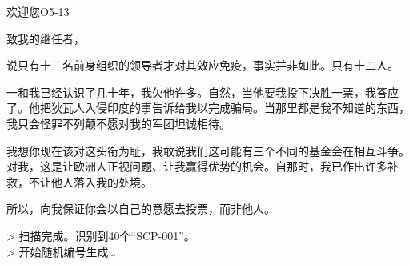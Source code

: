 \begin{whiteboxbb}
\begin{scpbox}

欢迎您O5-13

致我的继任者，

说只有十三名前身组织的领导者才对其效应免疫，事实并非如此。只有十二人。

一和我已经认识了几十年，我欠他许多。自然，当他要我投下决胜一票，我答应了。他把狄瓦人入侵印度的事告诉给我以完成骗局。当那里都是我不知道的东西，我只会怪罪不列颠不愿对我的军团坦诚相待。

我想你现在该对这头衔为耻，我敢说我们这可能有三个不同的基金会在相互斗争。对我，这是让欧洲人正视问题、让我赢得优势的机会。自那时，我已作出许多补救，不让他人落入我的处境。

所以，向我保证你会以自己的意愿去投票，而非他人。

\end{scpbox}

\end{whiteboxbb}

\hr

\begin{scpboxcmd}

> 扫描完成。识别到40个“SCP-001”。\\
> 开始随机编号生成…

\end{scpboxcmd}
